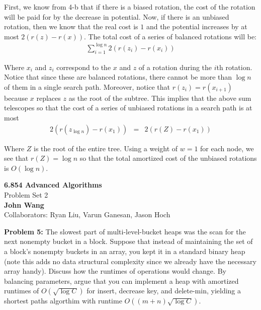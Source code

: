 \documentclass[psamsfonts]{amsart}
\newenvironment{sol}{\vspace{0.25cm}{\large \bfseries Solution:}}{\qedsymbol}
\newenvironment{prob}[1]{\begin{framed}{\large \bfseries Problem #1:}}{\end{framed}}
\newcommand{\makenewtitle}{
\begin{center}
{\huge \bfseries 6.854 Advanced Algorithms} \\
Problem Set 2\\
\vspace{0.25cm}
{\bfseries John Wang} \\
Collaborators: Ryan Liu, Varun Ganesan, Jason Hoch
\end{center}
\vspace{0.5cm}
}
\begin{document}
\begin{sol}
First, we know from 4-b that if there is a biased rotation, the cost of the rotation will be paid for by the decrease in potential. Now, if there is an unbiased rotation, then we know that the real cost is $1$ and the potential increases by at most $2(r(z) - r(x))$. The total cost of a series of balanced rotations will be:
\begin{eqnarray}
\sum_{i=1}^{\log n} 2 ( r(z_i) - r(x_i))
\end{eqnarray}

Where $x_i$ and $z_i$ correspond to the $x$ and $z$ of a rotation during the $i$th rotation. Notice that since these are balanced rotations, there cannot be more than $\log n$ of them in a single search path. Moreover, notice that $r(z_i) = r(x_{i+1})$ because $x$ replaces $z$ as the root of the subtree. This implies that the above sum telescopes so that the cost of a series of unbiased rotations in a search path is at most
\begin{eqnarray}
2(r(z_{\log n}) - r(x_1)) &=& 2(r(Z) - r(x_1))
\end{eqnarray}

Where $Z$ is the root of the entire tree. Using a weight of $w=1$ for each node, we see that $r(Z) = \log n$ so that the total amortized cost of the unbiased rotations is $O(\log n)$.
\end{sol}

\newpage
\makenewtitle

\begin{prob}{5}
The slowest part of multi-level-bucket heaps was the scan for the next nonempty bucket in a block. Suppose that instead of maintaining the set of a block's nonempty buckets in an array, you kept it in a standard binary heap (note this adds no data structural complexity since we already have the necessary array handy). Discuss how the runtimes of operations would change. By balancing parameters, argue that you can implement a heap with amortized runtimes of $O(\sqrt{\log C})$ for insert, decrease key, and delete-min, yielding a shortest paths algorthim with runtime $O((m+n) \sqrt{\log C})$. 
\end{prob}

\begin{sol}
\end{sol}
\end{document}
